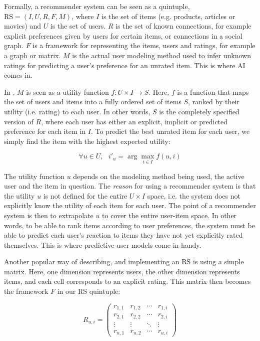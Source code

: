 Formally, a recommender system can be seen as a quintuple, $\mathrm{RS} = (I, U, R, F, M)$,
where $I$ is the set of items (e.g. products, articles or movies) and $U$ is the set of users.
$R$ is the set of known connections, for example explicit preferences given by users for certain items, or connections in a social graph.
$F$ is a framework for representing the items, users and ratings, for example a graph or matrix. 
$M$ is the actual user modeling method used to infer unknown ratings 
for predicting a user's preference for an unrated item. This is where AI comes in.

In \cite{Adomavicius2005}, $M$ is seen as a utility function
$f: U \times I \rightarrow S$. Here, $f$ is a function that maps the set
of users and items into a fully ordered set of items $S$, ranked by their
utility (i.e. rating) to each user. In other words, $S$ is the completely specified version of $R$,
where each user has either an explicit, implicit or predicted preference for each item in $I$.
To predict the best unrated item for each user, we simply find the item with the highest expected utility:

\begin{equation*}
  \forall u \in U,\text{ } i'_u = \arg\max_{i \in I} f(u,i)
\end{equation*}

The utility function $u$ depends on the modeling method being used, the active user and the item in question. 
The \emph{reason} for using a recommender system is that the utility $u$ is not defined for the entire $U \times I$ space, 
i.e. the system does not explicitly know the utility of each item for each user. 
The point of a recommender system is then to extrapolate $u$ to cover the entire user-item space. 
In other words, to be able to rank items according to user preferences, 
the system must be able to predict each user's reaction to items they have not yet explicitly rated themselves. 
This is where predictive user models come in handy.

Another popular way of describing, and implementing an RS is using a simple matrix. 
Here, one dimension represents users, the other dimension represents items,
and each cell corresponds to an explicit rating. This matrix then becomes the framework $F$ in our 
RS quintuple:

\begin{equation*}
 R_{u,i} =
 \begin{pmatrix}
  r_{1,1} & r_{1,2} & \cdots & r_{1,i} \\
  r_{2,1} & r_{2,2} & \cdots & r_{2,i} \\
  \vdots  & \vdots  & \ddots & \vdots  \\
  r_{u,1} & r_{u,2} & \cdots & r_{u,i}
 \end{pmatrix}
\end{equation*}

